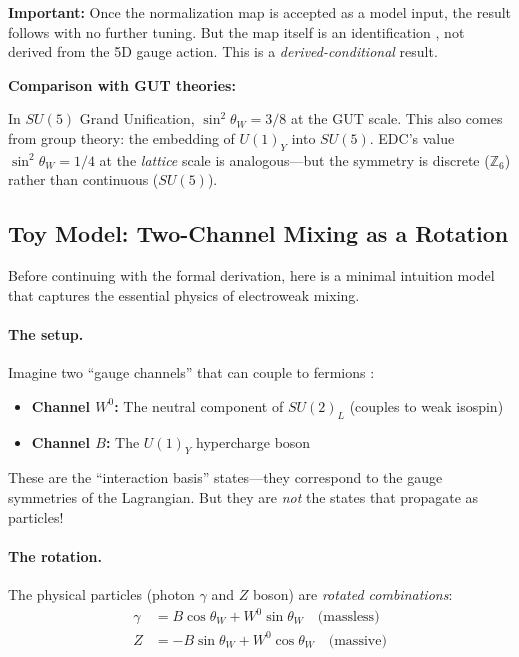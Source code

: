 \begin{tcolorbox}[colback=blue!5, colframe=blue!50!black,
  title={Physical Motivation: Why Subgroup Counting $\to$ Coupling Ratios}, breakable]
\textbf{Important:} Once the normalization map is accepted as a model input, the result
follows with no further tuning. But the map itself is an identification \tagP{}, not
derived from the 5D gauge action. This is a \emph{derived-conditional} result.

\textbf{Comparison with GUT theories:}

In $SU(5)$ Grand Unification, $\sin^2\theta_W = 3/8$ at the GUT scale.
This also comes from group theory: the embedding of $U(1)_Y$ into $SU(5)$.
EDC's value $\sin^2\theta_W = 1/4$ at the \emph{lattice} scale is analogous---but
the symmetry is discrete ($\mathbb{Z}_6$) rather than continuous ($SU(5)$).

\end{tcolorbox}


\subsection{Toy Model: Two-Channel Mixing as a Rotation}
\label{sec:ch3_toy_model}

Before continuing with the formal derivation, here is a minimal intuition model
that captures the essential physics of electroweak mixing.

\paragraph{The setup.}
Imagine two ``gauge channels'' that can couple to fermions \tagM{}:
\begin{itemize}[nosep]
    \item \textbf{Channel $W^0$:} The neutral component of $SU(2)_L$ (couples to weak isospin)
    \item \textbf{Channel $B$:} The $U(1)_Y$ hypercharge boson
\end{itemize}

These are the ``interaction basis'' states---they correspond to the gauge symmetries
of the Lagrangian. But they are \emph{not} the states that propagate as particles!

\paragraph{The rotation.}
The physical particles (photon $\gamma$ and $Z$ boson) are \emph{rotated combinations}:
\begin{align}
    \gamma &= B \cos\theta_W + W^0 \sin\theta_W \quad \text{(massless)} \\
    Z &= -B \sin\theta_W + W^0 \cos\theta_W \quad \text{(massive)}
\end{align}

